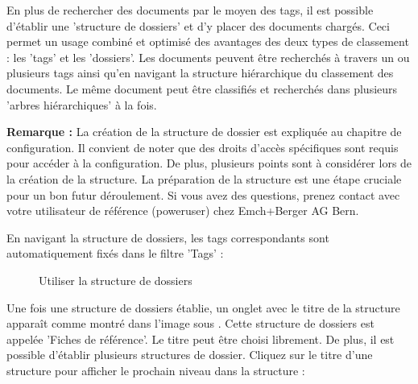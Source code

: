 En plus de rechercher des documents par le moyen des tags, il est possible d'établir une 'structure de dossiers' et d'y placer des documents chargés. Ceci permet un usage combiné et optimisé des avantages des deux types de classement : les 'tags' et les 'dossiers'. Les documents peuvent être recherchés à travers un ou plusieurs tags ainsi qu'en navigant la structure hiérarchique du classement des documents. Le même document peut être classifiés et recherchés dans plusieurs 'arbres hiérarchiques' à la fois.

\vspace{\baselineskip}

\textbf{Remarque :} La création de la structure de dossier est expliquée au chapitre de configuration. Il convient de noter que des droits d'accès spécifiques sont requis pour accéder à la configuration. De plus, plusieurs points sont à considérer lors de la création de la structure. La préparation de la structure est une étape cruciale pour un bon futur déroulement. Si vous avez des questions, prenez contact avec votre utilisateur de référence (poweruser) chez Emch+Berger AG Bern.

\vspace{\baselineskip}

En navigant la structure de dossiers, les tags correspondants sont automatiquement fixés dans le filtre 'Tags' :

\begin{figure}[H]
\caption{Utiliser la structure de dossiers}
\end{figure}

Une fois une structure de dossiers établie, un onglet avec le titre de la structure apparaît comme montré dans l'image sous . Cette structure de dossiers est appelée 'Fiches de référence'. Le titre peut être choisi librement. De plus, il est possible d'établir plusieurs structures de dossier. Cliquez sur le titre d'une structure pour afficher le prochain niveau dans la structure  :

